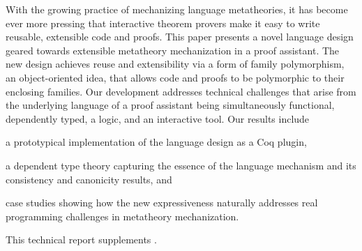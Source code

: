 
With the growing practice of mechanizing language metatheories,
it has become ever more pressing that interactive theorem provers 
make it easy to write reusable, extensible code and proofs.
%
This paper presents a novel language design geared towards extensible metatheory
mechanization in a proof assistant.
The new design achieves reuse and extensibility via a form of family
polymorphism, an object-oriented idea, that allows code and
proofs to be polymorphic to their enclosing families.
Our development addresses technical challenges that arise
from the underlying language of a proof assistant being simultaneously
functional, dependently typed, a logic, and an interactive tool.
%
Our results include
\begin{enumerate*}
\item a prototypical implementation of the language design as a Coq plugin,
\item a dependent type theory capturing the essence of the language mechanism
      and its consistency and canonicity results,
and 
\item case studies showing how the new expressiveness naturally addresses real
programming challenges in metatheory mechanization.
\end{enumerate*}

\ifreport
\smallskip

\noindent
This technical report supplements \citet{fpop-pldi2023}.
\fi